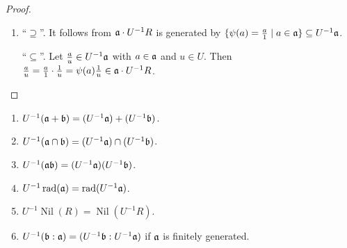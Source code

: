 \begin{proof}
\begin{enumerate}
            \begin{center}
            \end{center}
        \item 
            ``$\supseteq$''. It follows from $\mathfrak{a} \cdot U^{-1}R$ is generated by $\{\psi(a) = \frac{a}{1} \mid a \in \mathfrak{a}\} \subseteq U^{-1}\mathfrak{a}$. \par 
            ``$\subseteq$''. Let $\frac{a}{u} \in U^{-1}\mathfrak{a}$ with $a \in \mathfrak{a}$ and $u \in U$. Then $\frac{a}{u} = \frac{a}{1} \cdot \frac{1}{u} = \psi(a)\frac{1}{u} \in \mathfrak{a} \cdot U^{-1}R$. \qedhere
    \end{enumerate}
\end{proof}

\begin{proposition}
    \begin{enumerate}
        \item $U^{-1}(\mathfrak{a} + \mathfrak{b}) = (U^{-1}\mathfrak{a}) + (U^{-1}\mathfrak{b})$.
        \item $U^{-1}(\mathfrak{a} \cap \mathfrak{b}) = (U^{-1}\mathfrak{a}) \cap (U^{-1}\mathfrak{b})$.
        \item $U^{-1}(\mathfrak{a} \mathfrak{b}) = (U^{-1}\mathfrak{a}) (U^{-1}\mathfrak{b})$.
        \item $U^{-1} \operatorname{rad}(\mathfrak{a}) = \operatorname{rad}(U^{-1}\mathfrak{a})$.
        \item $U^{-1}\operatorname{Nil}(R) = \operatorname{Nil}(U^{-1}R)$.
        \item $U^{-1}(\mathfrak{b}:\mathfrak{a}) = (U^{-1}\mathfrak{b}:U^{-1}\mathfrak{a})$  if $\mathfrak{a}$ is finitely generated.
    \end{enumerate}
\end{proposition}

